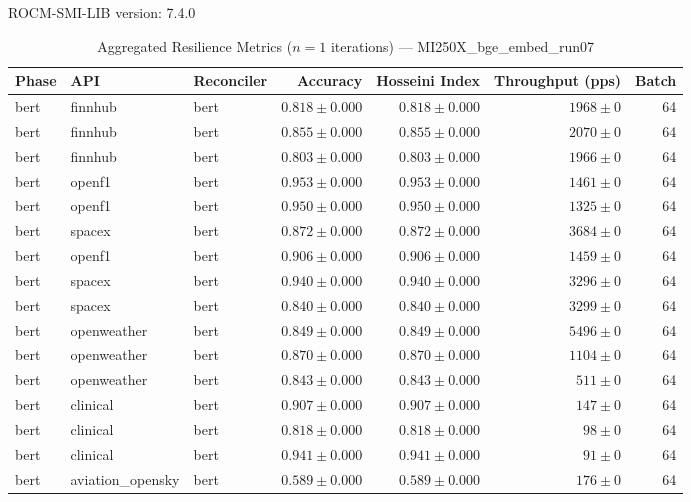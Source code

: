 ROCM-SMI-LIB version: 7.4.0

\begin{table}[htbp]
\caption{Aggregated Resilience Metrics ($n=1$ iterations) --- MI250X_bge_embed_run07}
\begin{tabular}{l l l r r r r}
\hline
Phase & API & Reconciler & Accuracy & Hosseini Index & Throughput (pps) & Batch \\
\hline
bert & finnhub & bert & $0.818\pm0.000$ & $0.818\pm0.000$ & $1968\pm0$ & 64 \\
bert & finnhub & bert & $0.855\pm0.000$ & $0.855\pm0.000$ & $2070\pm0$ & 64 \\
bert & finnhub & bert & $0.803\pm0.000$ & $0.803\pm0.000$ & $1966\pm0$ & 64 \\
bert & openf1 & bert & $0.953\pm0.000$ & $0.953\pm0.000$ & $1461\pm0$ & 64 \\
bert & openf1 & bert & $0.950\pm0.000$ & $0.950\pm0.000$ & $1325\pm0$ & 64 \\
bert & spacex & bert & $0.872\pm0.000$ & $0.872\pm0.000$ & $3684\pm0$ & 64 \\
bert & openf1 & bert & $0.906\pm0.000$ & $0.906\pm0.000$ & $1459\pm0$ & 64 \\
bert & spacex & bert & $0.940\pm0.000$ & $0.940\pm0.000$ & $3296\pm0$ & 64 \\
bert & spacex & bert & $0.840\pm0.000$ & $0.840\pm0.000$ & $3299\pm0$ & 64 \\
bert & openweather & bert & $0.849\pm0.000$ & $0.849\pm0.000$ & $5496\pm0$ & 64 \\
bert & openweather & bert & $0.870\pm0.000$ & $0.870\pm0.000$ & $1104\pm0$ & 64 \\
bert & openweather & bert & $0.843\pm0.000$ & $0.843\pm0.000$ & $511\pm0$ & 64 \\
bert & clinical & bert & $0.907\pm0.000$ & $0.907\pm0.000$ & $147\pm0$ & 64 \\
bert & clinical & bert & $0.818\pm0.000$ & $0.818\pm0.000$ & $98\pm0$ & 64 \\
bert & clinical & bert & $0.941\pm0.000$ & $0.941\pm0.000$ & $91\pm0$ & 64 \\
bert & aviation\_opensky & bert & $0.589\pm0.000$ & $0.589\pm0.000$ & $176\pm0$ & 64 \\

\end{tabular}
\end{table}
